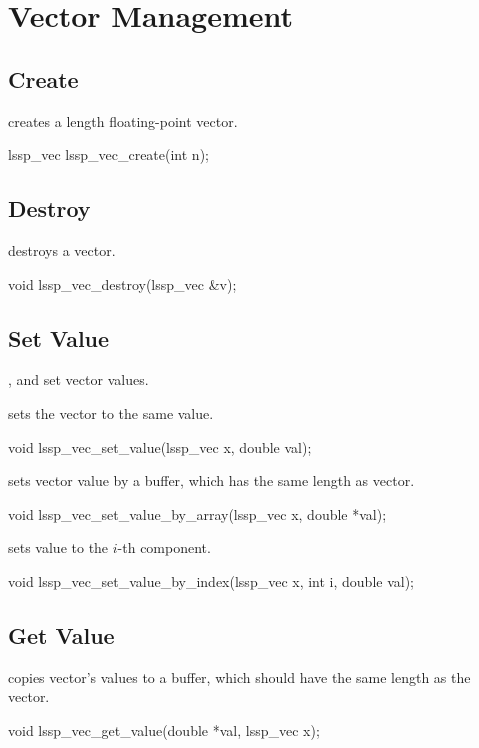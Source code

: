 \section{Vector Management}

\subsection{Create}
 creates a length  floating-point vector.
\begin{evb}
lssp_vec lssp_vec_create(int n);
\end{evb}

\subsection{Destroy}

 destroys a vector.
\begin{evb}
void lssp_vec_destroy(lssp_vec &v);
\end{evb}

\subsection{Set Value}
,  and 
set vector values.

 sets the vector to the same value.
\begin{evb}
void lssp_vec_set_value(lssp_vec x, double val);
\end{evb}


 sets vector value by a buffer, which has the same length as
vector.
\begin{evb}
void lssp_vec_set_value_by_array(lssp_vec x, double *val);
\end{evb}

 sets value to the $i$-th component.
\begin{evb}
void lssp_vec_set_value_by_index(lssp_vec x, int i, double val);
\end{evb}

\subsection{Get Value}
 copies vector's values to a buffer, which should have the same length as
the vector.
\begin{evb}
void lssp_vec_get_value(double *val, lssp_vec x);
\end{evb}

